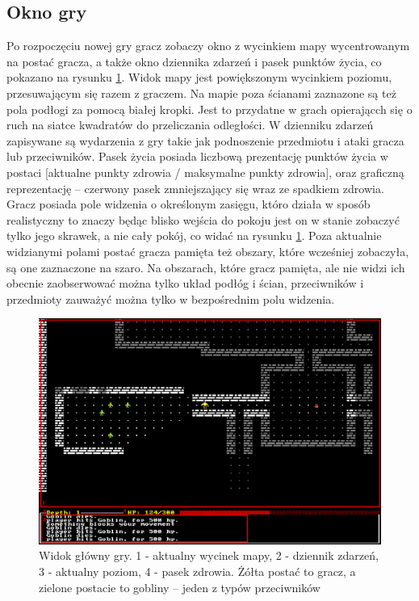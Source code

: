 \documentclass[12pt,twoside]{article}
\begin{document}
\subsection{Okno gry}
Po rozpoczęciu nowej gry gracz zobaczy okno z wycinkiem mapy wycentrowanym na postać gracza, a także okno dziennika zdarzeń i pasek punktów życia, co pokazano na rysunku \ref{mygame:game_window}. Widok mapy jest powiększonym wycinkiem poziomu, przesuwającym się razem z graczem. Na mapie poza ścianami zaznazone są też pola podłogi za pomocą białej kropki. Jest to przydatne w grach opierającch się o ruch na siatce kwadratów do przeliczania odległości. W dzienniku zdarzeń zapisywane są wydarzenia z gry takie jak podnoszenie przedmiotu i ataki gracza lub przeciwników. Pasek życia posiada liczbową prezentację punktów życia w postaci [aktualne punkty zdrowia / maksymalne punkty zdrowia], oraz graficzną reprezentację -- czerwony pasek zmniejszający się wraz ze spadkiem zdrowia. Gracz posiada pole widzenia o określonym zasięgu, któro działa w sposób realistyczny to znaczy będąc blisko wejścia do pokoju jest on w stanie zobaczyć tylko jego skrawek, a nie cały pokój, co widać na rysunku \ref{mygame:game_window}. Poza aktualnie widzianymi polami postać gracza pamięta też obszary, które wcześniej zobaczyła, są one zaznaczone na szaro. Na obszarach, które gracz pamięta, ale nie widzi ich obecnie zaobserwować można tylko układ podłóg i ścian, przeciwników i przedmioty zauważyć można tylko w bezpośrednim polu widzenia.

\FloatBarrier
\begin{figure}[h]
	\centering
	\includegraphics[width=16cm]{images/mygame/game_window.png}
	\caption{Widok główny gry. 1 - aktualny wycinek mapy, 2 - dziennik zdarzeń, 3 - aktualny poziom, 4 - pasek zdrowia. Żółta postać to gracz, a zielone postacie to gobliny -- jeden z typów przeciwników }
	\label{mygame:game_window}
\end{figure}
\FloatBarrier
\end{document}
